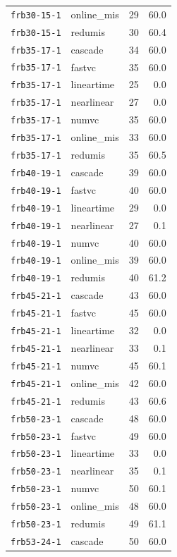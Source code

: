\begin{longtable}{l l r r}
\texttt{frb30-15-1} & online\_mis & 29 & 60.0 \\
\texttt{frb30-15-1} & redumis & 30 & 60.4 \\
\texttt{frb35-17-1} & cascade & 34 & 60.0 \\
\texttt{frb35-17-1} & fastvc & 35 & 60.0 \\
\texttt{frb35-17-1} & lineartime & 25 & 0.0 \\
\texttt{frb35-17-1} & nearlinear & 27 & 0.0 \\
\texttt{frb35-17-1} & numvc & 35 & 60.0 \\
\texttt{frb35-17-1} & online\_mis & 33 & 60.0 \\
\texttt{frb35-17-1} & redumis & 35 & 60.5 \\
\texttt{frb40-19-1} & cascade & 39 & 60.0 \\
\texttt{frb40-19-1} & fastvc & 40 & 60.0 \\
\texttt{frb40-19-1} & lineartime & 29 & 0.0 \\
\texttt{frb40-19-1} & nearlinear & 27 & 0.1 \\
\texttt{frb40-19-1} & numvc & 40 & 60.0 \\
\texttt{frb40-19-1} & online\_mis & 39 & 60.0 \\
\texttt{frb40-19-1} & redumis & 40 & 61.2 \\
\texttt{frb45-21-1} & cascade & 43 & 60.0 \\
\texttt{frb45-21-1} & fastvc & 45 & 60.0 \\
\texttt{frb45-21-1} & lineartime & 32 & 0.0 \\
\texttt{frb45-21-1} & nearlinear & 33 & 0.1 \\
\texttt{frb45-21-1} & numvc & 45 & 60.1 \\
\texttt{frb45-21-1} & online\_mis & 42 & 60.0 \\
\texttt{frb45-21-1} & redumis & 43 & 60.6 \\
\texttt{frb50-23-1} & cascade & 48 & 60.0 \\
\texttt{frb50-23-1} & fastvc & 49 & 60.0 \\
\texttt{frb50-23-1} & lineartime & 33 & 0.0 \\
\texttt{frb50-23-1} & nearlinear & 35 & 0.1 \\
\texttt{frb50-23-1} & numvc & 50 & 60.1 \\
\texttt{frb50-23-1} & online\_mis & 48 & 60.0 \\
\texttt{frb50-23-1} & redumis & 49 & 61.1 \\
\texttt{frb53-24-1} & cascade & 50 & 60.0 \\

\end{longtable}
